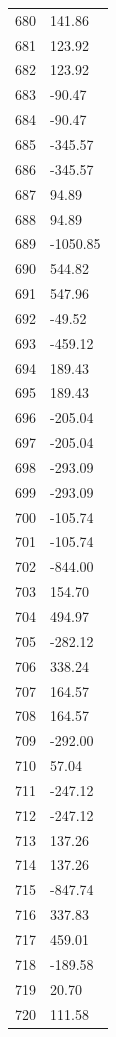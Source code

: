 \documentclass[a4paper,11pt]{article}
\begin{document}
\begin{center}
\begin{longtable}{|R{1.5cm}|R{2.5cm}|}
  680 &       141.86 \\
  681 &       123.92 \\
  682 &       123.92 \\
  683 &       -90.47 \\
  684 &       -90.47 \\
  685 &      -345.57 \\
  686 &      -345.57 \\
  687 &        94.89 \\
  688 &        94.89 \\
  689 &     -1050.85 \\
  690 &       544.82 \\
  691 &       547.96 \\
  692 &       -49.52 \\
  693 &      -459.12 \\
  694 &       189.43 \\
  695 &       189.43 \\
  696 &      -205.04 \\
  697 &      -205.04 \\
  698 &      -293.09 \\
  699 &      -293.09 \\
  700 &      -105.74 \\
  701 &      -105.74 \\
  702 &      -844.00 \\
  703 &       154.70 \\
  704 &       494.97 \\
  705 &      -282.12 \\
  706 &       338.24 \\
  707 &       164.57 \\
  708 &       164.57 \\
  709 &      -292.00 \\
  710 &        57.04 \\
  711 &      -247.12 \\
  712 &      -247.12 \\
  713 &       137.26 \\
  714 &       137.26 \\
  715 &      -847.74 \\
  716 &       337.83 \\
  717 &       459.01 \\
  718 &      -189.58 \\
  719 &        20.70 \\
  720 &       111.58 \\

\end{longtable}
\end{center}
\end{document}
